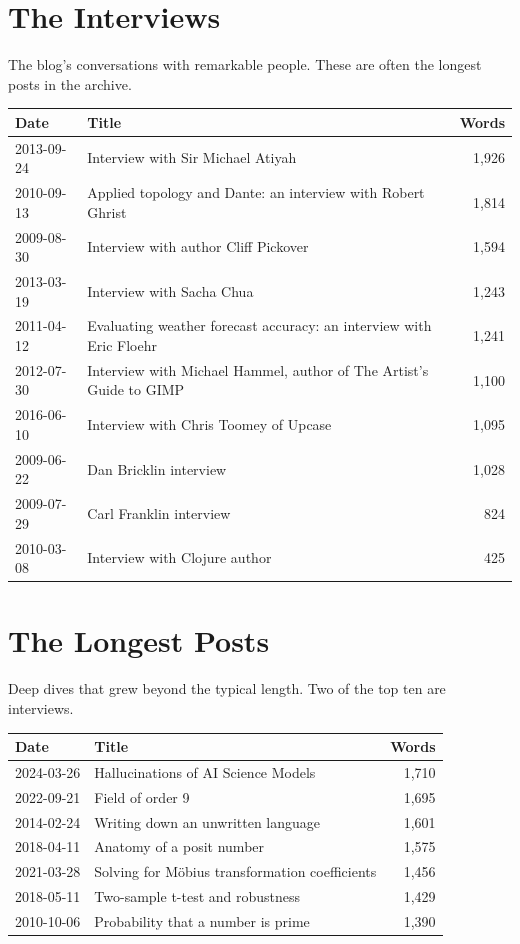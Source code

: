 \bigskip

\section*{The Interviews}

The blog's conversations with remarkable people. These are often the longest posts in the archive.

\begin{longtable}{l p{5.5cm} r}
\toprule
\textbf{Date} & \textbf{Title} & \textbf{Words} \tabularnewline
\midrule
2013-09-24 & Interview with Sir Michael Atiyah & 1,926 \tabularnewline
2010-09-13 & Applied topology and Dante: an interview with Robert Ghrist & 1,814 \tabularnewline
2009-08-30 & Interview with author Cliff Pickover & 1,594 \tabularnewline
2013-03-19 & Interview with Sacha Chua & 1,243 \tabularnewline
2011-04-12 & Evaluating weather forecast accuracy: an interview with Eric Floehr & 1,241 \tabularnewline
2012-07-30 & Interview with Michael Hammel, author of The Artist's Guide to GIMP & 1,100 \tabularnewline
2016-06-10 & Interview with Chris Toomey of Upcase & 1,095 \tabularnewline
2009-06-22 & Dan Bricklin interview & 1,028 \tabularnewline
2009-07-29 & Carl Franklin interview & 824 \tabularnewline
2010-03-08 & Interview with Clojure author & 425 \tabularnewline
\bottomrule
\end{longtable}

\bigskip

\section*{The Longest Posts}

Deep dives that grew beyond the typical length. Two of the top ten are interviews.

\begin{longtable}{l p{5.5cm} r}
\toprule
\textbf{Date} & \textbf{Title} & \textbf{Words} \tabularnewline
\midrule
2024-03-26 & Hallucinations of AI Science Models & 1,710 \tabularnewline
2022-09-21 & Field of order 9 & 1,695 \tabularnewline
2014-02-24 & Writing down an unwritten language & 1,601 \tabularnewline
2018-04-11 & Anatomy of a posit number & 1,575 \tabularnewline
2021-03-28 & Solving for Möbius transformation coefficients & 1,456 \tabularnewline
2018-05-11 & Two-sample t-test and robustness & 1,429 \tabularnewline
2010-10-06 & Probability that a number is prime & 1,390 \tabularnewline
\bottomrule
\end{longtable}


